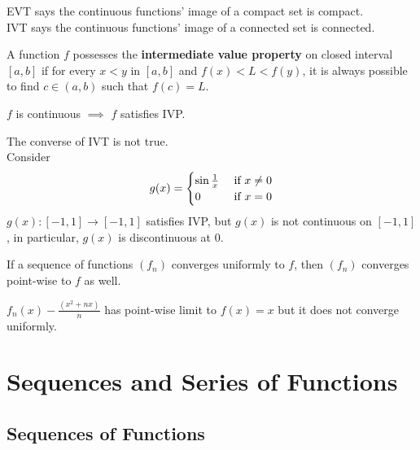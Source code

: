 \documentclass[11pt]{article}
\begin{document}
	\begin{remark}
		EVT says the continuous functions' image of a compact set is compact. \\
		IVT says the continuous functions' image of a connected set is connected.
	\end{remark}
	
	\begin{definition}
		A function $f$ possesses the \textbf{intermediate value property} on closed interval $[a, b]$ if for every $x < y$ in $[a, b]$ and $f(x) < L < f(y)$, it is always possible to find $c \in (a, b)$ such that $f(c) = L$.
	\end{definition}
	
	\begin{theorem}
		$f$ is continuous $\implies$ $f$ satisfies IVP.
	\end{theorem}
	
	\begin{remark}
		The converse of IVT is not true. \\
		Consider 
		\begin{align}
			g(x) = \begin{cases}
				\sin \frac{1}{x} &\text{{ if }} x \neq 0 \\
				0 &\text{{ if }} x = 0
			\end{cases}
		\end{align}
		$g(x): [-1, 1] \to [-1 , 1]$ satisfies IVP, but $g(x)$ is not continuous on $[-1, 1]$, in particular, $g(x)$ is discontinuous at 0.
	\end{remark}
	
	\begin{proposition}
		If a sequence of functions $(f_n)$ converges uniformly to $f$, then $(f_n)$ converges point-wise to $f$ as well.
	\end{proposition}
	
	\begin{example}
		$f_n(x) - \frac{(x^2 + nx)}{n}$ has point-wise limit to $f(x) = x$ but it does not converge uniformly.
	\end{example}
	
	\section{Sequences and Series of Functions}
	\subsection{Sequences of Functions}
	
\end{document}
